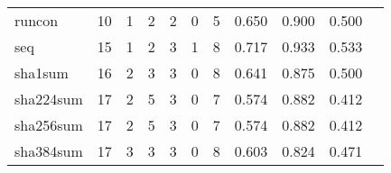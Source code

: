 \begin{longtable}{lp{1.20cm}p{1.20cm}p{1.20cm}p{1.20cm}p{1.20cm}p{1.20cm}p{1.20cm}p{1.20cm}p{1.20cm}p{1.20cm}}
runcon    &                                    10 &                                                  1 &                                                  2 &                                                  2 &                                                  0 &                                                  5 &                                         0.650 &                                              0.900 &                                              0.500 \\
seq       &                                    15 &                                                  1 &                                                  2 &                                                  3 &                                                  1 &                                                  8 &                                         0.717 &                                              0.933 &                                              0.533 \\
sha1sum   &                                    16 &                                                  2 &                                                  3 &                                                  3 &                                                  0 &                                                  8 &                                         0.641 &                                              0.875 &                                              0.500 \\
sha224sum &                                    17 &                                                  2 &                                                  5 &                                                  3 &                                                  0 &                                                  7 &                                         0.574 &                                              0.882 &                                              0.412 \\
sha256sum &                                    17 &                                                  2 &                                                  5 &                                                  3 &                                                  0 &                                                  7 &                                         0.574 &                                              0.882 &                                              0.412 \\
sha384sum &                                    17 &                                                  3 &                                                  3 &                                                  3 &                                                  0 &                                                  8 &                                         0.603 &                                              0.824 &                                              0.471 \\

\end{longtable}
